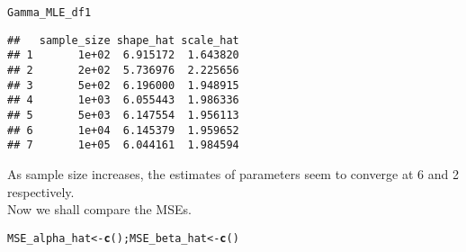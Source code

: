 \documentclass[11pt, a4paper]{article}\usepackage[]{graphicx}\usepackage[]{xcolor}
\makeatletter
\newcommand{\hldef}[1]{\textcolor[rgb]{0.345,0.345,0.345}{#1}}%
\newcommand{\hlkwb}[1]{\textcolor[rgb]{0.69,0.353,0.396}{#1}}%
\newcommand{\hlkwd}[1]{\textcolor[rgb]{0.737,0.353,0.396}{\textbf{#1}}}%
\newenvironment{kframe}{%
 \def\at@end@of@kframe{}%
 \ifinner\ifhmode%
  \def\at@end@of@kframe{\end{minipage}}%
  \begin{minipage}{\columnwidth}%
 \fi\fi%
 \def\FrameCommand##1{\hskip\@totalleftmargin \hskip-\fboxsep
 \colorbox{shadecolor}{##1}\hskip-\fboxsep
     \hskip-\linewidth \hskip-\@totalleftmargin \hskip\columnwidth}%
 \MakeFramed {\advance\hsize-\width
   \@totalleftmargin\z@ \linewidth\hsize
   \@setminipage}}%
 {\par\unskip\endMakeFramed%
 \at@end@of@kframe}
\newenvironment{knitrout}{}{} %
\makeatother
\begin{document}
\begin{knitrout}
\color{fgcolor}\begin{kframe}
\begin{alltt}
\hldef{Gamma_MLE_df1}
\end{alltt}
\begin{verbatim}
##   sample_size shape_hat scale_hat
## 1       1e+02  6.915172  1.643820
## 2       2e+02  5.736976  2.225656
## 3       5e+02  6.196000  1.948915
## 4       1e+03  6.055443  1.986336
## 5       5e+03  6.147554  1.956113
## 6       1e+04  6.145379  1.959652
## 7       1e+05  6.044161  1.984594
\end{verbatim}
\end{kframe}
\end{knitrout}

\smallpencil \hspace{0.1cm} {\setlength{\spaceskip}{1em plus 0.5em minus 0.5em} \fontsize{17}{20}\myfont As sample size increases, the estimates of parameters seem to converge at 6 and 2 respectively. \\

Now we shall compare the MSEs.
\par}




\begin{knitrout}
\color{fgcolor}\begin{kframe}
\begin{alltt}
\hldef{MSE_alpha_hat} \hlkwb{<-} \hlkwd{c}\hldef{(); MSE_beta_hat} \hlkwb{<-} \hlkwd{c}\hldef{()}
\end{alltt}
\end{kframe}
\end{knitrout}
\end{document}
